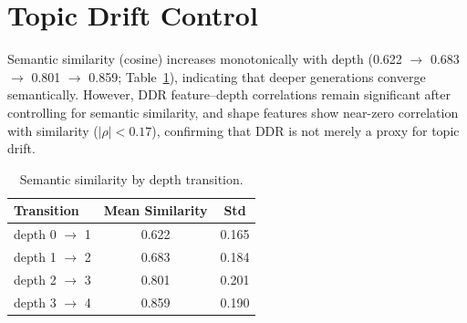 \documentclass[11pt,a4paper]{article}
\newcommand{\rhosp}{\rho}
\begin{document}
\section{Topic Drift Control}
\label{app:topic}

Semantic similarity (cosine) increases monotonically with depth (0.622 $\to$ 0.683 $\to$ 0.801 $\to$ 0.859; Table~\ref{tab:topic}),
indicating that deeper generations converge semantically.
However, DDR feature--depth correlations remain significant after controlling for semantic similarity,
and shape features show near-zero correlation with similarity ($|\rhosp| < 0.17$),
confirming that DDR is not merely a proxy for topic drift.

\begin{table}[h]
\centering
\caption{Semantic similarity by depth transition.}
\label{tab:topic}
\begin{tabular}{lcc}
\toprule
\textbf{Transition} & \textbf{Mean Similarity} & \textbf{Std} \\
\midrule
depth 0 $\to$ 1 & 0.622 & 0.165 \\
depth 1 $\to$ 2 & 0.683 & 0.184 \\
depth 2 $\to$ 3 & 0.801 & 0.201 \\
depth 3 $\to$ 4 & 0.859 & 0.190 \\
\bottomrule
\end{tabular}
\end{table}
\end{document}
